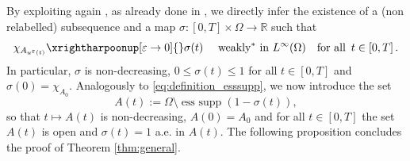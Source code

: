 \documentclass[a4paper,11pt,reqno]{amsart}
\numberwithin{equation}{section}
\theoremstyle{definition}
\theoremstyle{remark}
\renewcommand{\r}{\mathbb{R}}
\begin{document}
    By exploiting again , as already done in , we directly infer the existence of a (non relabelled) subsequence and a map $\sigma\colon [0,T]\times\Omega\to \r$ such that 
    \begin{equation} \label{eq.sigma}        \chi_{{A_{u^\varepsilon(t)}}} \xrightharpoonup[\varepsilon\to 0]{} \sigma(t) \quad \text{ weakly$^*$ in } L^\infty(\Omega) \quad \text{for all } \, t \in [0, T] \,.    \end{equation}
    In particular, $\sigma$ is non-decreasing, $0\leq \sigma(t)\leq 1$ for all $t \in [0, T]$ and $\sigma(0)=\chi_{A_0}.$ Analogously to \eqref{eq:definition_esssupp}, we now introduce the set
\begin{equation}\label{eq:Asigma}
        A(t) := \Omega\setminus \operatorname{ess\ supp} (1-\sigma(t)),
\end{equation}
so that $t\mapsto A(t)$ is non-decreasing, $A(0)=A_0$ and for all $t\in [0,T]$ the set $A(t)$ is open and $\sigma(t)=1$ a.e. in $A(t)$. The following proposition concludes the proof of Theorem \ref{thm:general}.
\end{document}
